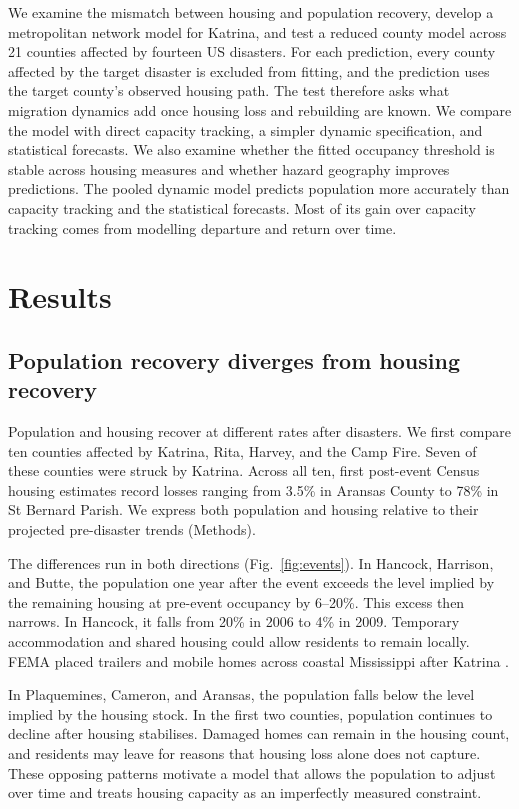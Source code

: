 \documentclass[11pt]{article}
\begin{document}
We examine the mismatch between housing and population recovery, develop a metropolitan network model for Katrina, and test a reduced county model across 21 counties affected by fourteen US disasters. For each prediction, every county affected by the target disaster is excluded from fitting, and the prediction uses the target county's observed housing path. The test therefore asks what migration dynamics add once housing loss and rebuilding are known. We compare the model with direct capacity tracking, a simpler dynamic specification, and statistical forecasts. We also examine whether the fitted occupancy threshold is stable across housing measures and whether hazard geography improves predictions. The pooled dynamic model predicts population more accurately than capacity tracking and the statistical forecasts. Most of its gain over capacity tracking comes from modelling departure and return over time.


\section*{Results}

\subsection*{Population recovery diverges from housing recovery}\label{sec:panel}

Population and housing recover at different rates after disasters. We first compare ten counties affected by Katrina, Rita, Harvey, and the Camp Fire. Seven of these counties were struck by Katrina. Across all ten, first post-event Census housing estimates record losses ranging from 3.5\% in Aransas County to 78\% in St Bernard Parish. We express both population and housing relative to their projected pre-disaster trends (Methods).

The differences run in both directions (Fig.~\ref{fig:events}). In Hancock, Harrison, and Butte, the population one year after the event exceeds the level implied by the remaining housing at pre-event occupancy by 6--20\%. This excess then narrows. In Hancock, it falls from 20\% in 2006 to 4\% in 2009. Temporary accommodation and shared housing could allow residents to remain locally. FEMA placed trailers and mobile homes across coastal Mississippi after Katrina \citep{GAO2007,EvansCowley2011}.

In Plaquemines, Cameron, and Aransas, the population falls below the level implied by the housing stock. In the first two counties, population continues to decline after housing stabilises. Damaged homes can remain in the housing count, and residents may leave for reasons that housing loss alone does not capture. These opposing patterns motivate a model that allows the population to adjust over time and treats housing capacity as an imperfectly measured constraint.
\end{document}
